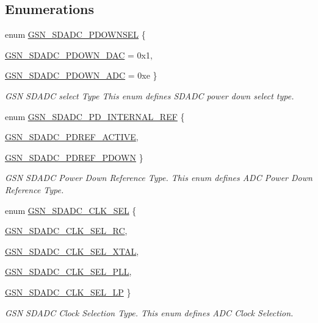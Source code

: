 \subsection*{Enumerations}
\begin{DoxyCompactItemize}
\item 
enum \hyperlink{a00652_ga8981092cc91f6707abd5185868f1250c}{GSN\_\-SDADC\_\-PDOWNSEL} \{ \par
\hyperlink{a00652_gga8981092cc91f6707abd5185868f1250ca024733ba6c33af684e6e7ce39d593d34}{GSN\_\-SDADC\_\-PDOWN\_\-DAC} =  0x1, 
\par
\hyperlink{a00652_gga8981092cc91f6707abd5185868f1250ca118efb932cece93b73fbc87111ef4691}{GSN\_\-SDADC\_\-PDOWN\_\-ADC} =  0xe
 \}
\begin{DoxyCompactList}\small\item\em GSN SDADC select Type This enum defines SDADC power down select type. \end{DoxyCompactList}\item 
enum \hyperlink{a00652_ga3fd8f1ef5efcdbab4b29cdd40ca09a32}{GSN\_\-SDADC\_\-PD\_\-INTERNAL\_\-REF} \{ \par
\hyperlink{a00652_gga3fd8f1ef5efcdbab4b29cdd40ca09a32ac41b8abac136266c277dde5c48fc3da6}{GSN\_\-SDADC\_\-PDREF\_\-ACTIVE}, 
\par
\hyperlink{a00652_gga3fd8f1ef5efcdbab4b29cdd40ca09a32ade7574a2321f3308e4ef1e1d0292b0d2}{GSN\_\-SDADC\_\-PDREF\_\-PDOWN}
 \}
\begin{DoxyCompactList}\small\item\em GSN SDADC Power Down Reference Type. This enum defines ADC Power Down Reference Type. \end{DoxyCompactList}\item 
enum \hyperlink{a00652_gac143749cf1a15e188558bc6ac9d32de2}{GSN\_\-SDADC\_\-CLK\_\-SEL} \{ \par
\hyperlink{a00652_ggac143749cf1a15e188558bc6ac9d32de2aca05cc7de08034d2b47943af15dcf5fe}{GSN\_\-SDADC\_\-CLK\_\-SEL\_\-RC}, 
\par
\hyperlink{a00652_ggac143749cf1a15e188558bc6ac9d32de2a579bf31f63db8fde97100a4cd93c8d17}{GSN\_\-SDADC\_\-CLK\_\-SEL\_\-XTAL}, 
\par
\hyperlink{a00652_ggac143749cf1a15e188558bc6ac9d32de2a7791e25e82023d87012d594be136eb71}{GSN\_\-SDADC\_\-CLK\_\-SEL\_\-PLL}, 
\par
\hyperlink{a00652_ggac143749cf1a15e188558bc6ac9d32de2abca28181edbda96455fee4c1720430e8}{GSN\_\-SDADC\_\-CLK\_\-SEL\_\-LP}
 \}
\begin{DoxyCompactList}\small\item\em GSN SDADC Clock Selection Type. This enum defines ADC Clock Selection. \end{DoxyCompactList}\item 

\end{DoxyCompactItemize}
